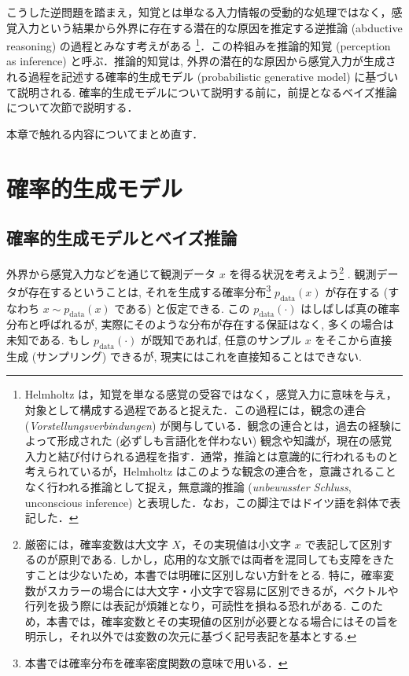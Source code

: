 \documentclass[titlepage]{ltjsbook}
\begin{document}
こうした逆問題を踏まえ，知覚とは単なる入力情報の受動的な処理ではなく，感覚入力という結果から外界に存在する潜在的な原因を推定する逆推論 (abductive reasoning) の過程とみなす考えがある \citep{helmholtz1867, mumford1992computational, kawato1993forward, friston2003learning}\footnote{Helmholtz は，知覚を単なる感覚の受容ではなく，感覚入力に意味を与え，対象として構成する過程であると捉えた．この過程には，観念の連合 (\textit{Vorstellungsverbindungen}) が関与している．観念の連合とは，過去の経験によって形成された (必ずしも言語化を伴わない) 観念や知識が，現在の感覚入力と結び付けられる過程を指す．通常，推論とは意識的に行われるものと考えられているが，Helmholtz はこのような観念の連合を，意識されることなく行われる推論として捉え，無意識的推論 (\textit{unbewusster Schluss}, unconscious inference)  と表現した．なお，この脚注ではドイツ語を斜体で表記した．}．この枠組みを推論的知覚 (perception as inference) と呼ぶ．推論的知覚は, 外界の潜在的な原因から感覚入力が生成される過程を記述する確率的生成モデル (probabilistic generative model) に基づいて説明される. 確率的生成モデルについて説明する前に，前提となるベイズ推論について次節で説明する．

\begin{tcolorbox}
本章で触れる内容についてまとめ直す．
\end{tcolorbox}

\section{確率的生成モデル}
\subsection{確率的生成モデルとベイズ推論}
外界から感覚入力などを通じて観測データ $x$ を得る状況を考えよう\footnote{厳密には，確率変数は大文字 $X$，その実現値は小文字 $x$ で表記して区別するのが原則である. しかし，応用的な文脈では両者を混同しても支障をきたすことは少ないため，本書では明確に区別しない方針をとる. 特に，確率変数がスカラーの場合には大文字・小文字で容易に区別できるが，ベクトルや行列を扱う際には表記が煩雑となり，可読性を損ねる恐れがある. このため，本書では，確率変数とその実現値の区別が必要となる場合にはその旨を明示し，それ以外では変数の次元に基づく記号表記を基本とする. } . 観測データが存在するということは, それを生成する確率分布\footnote{本書では確率分布を確率密度関数の意味で用いる．} $p_{\mathrm{data}}(x)$ が存在する (すなわち $x \sim p_{\mathrm{data}}(x)$ である) と仮定できる. この $p_{\mathrm{data}}(\cdot)$ はしばしば真の確率分布と呼ばれるが, 実際にそのような分布が存在する保証はなく, 多くの場合は未知である. もし $p_{\mathrm{data}}(\cdot)$ が既知であれば, 任意のサンプル $x$ をそこから直接生成 (サンプリング) できるが, 現実にはこれを直接知ることはできない. 
\end{document}
